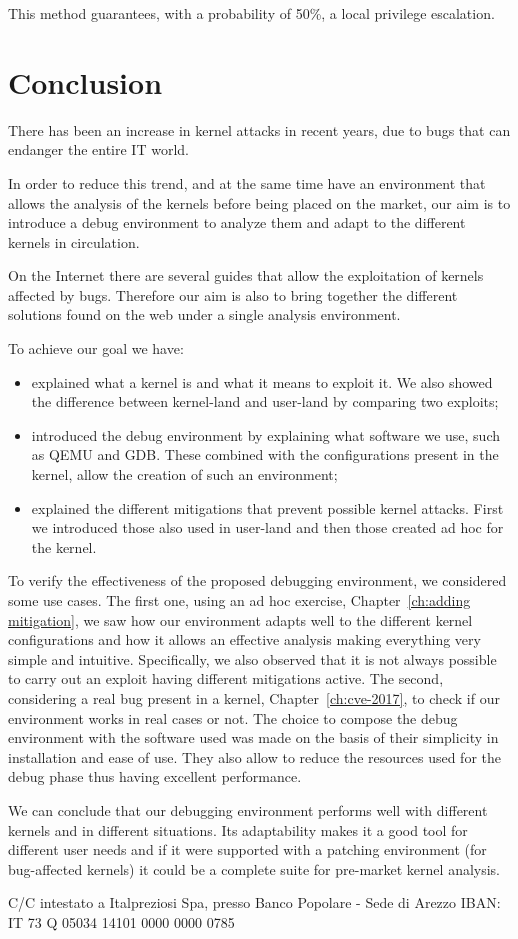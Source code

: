 \documentclass{masterthesis}
\newcommand{\refToChapter}[1]{Chapter~\ref{ch:#1}\xspace}
\begin{document}
This method guarantees, with a probability of 50\%, a local privilege escalation.

\chapter{Conclusion}
There has been an increase in kernel attacks in recent years, due to bugs that can endanger the entire IT world.

In order to reduce this trend, and at the same time have an environment that allows the analysis of the kernels before being placed on the market, our aim is to introduce a debug environment to analyze them and adapt to the different kernels in circulation.

On the Internet there are several guides that allow the exploitation of kernels affected by bugs. Therefore our aim is also to bring together the different solutions found on the web under a single analysis environment.

To achieve our goal we have:
\begin{itemize}
\item explained what a kernel is and what it means to exploit it.  We also showed the difference between kernel-land and user-land by comparing two exploits;
\item introduced the debug environment by explaining what software we use, such as QEMU and GDB.  These combined with the configurations present in the kernel, allow the creation of such an environment;
\item explained the different mitigations that prevent possible kernel attacks.  First we introduced those also used in user-land and then those created ad hoc for the kernel.
\end{itemize}

To verify the effectiveness of the proposed debugging environment, we considered some use cases.
The first one, using an ad hoc exercise, \refToChapter{adding mitigation}, we saw how our environment adapts well to the different kernel configurations and how it allows an effective analysis making everything very simple and intuitive.  Specifically, we also observed that it is not always possible to carry out an exploit having different mitigations active.
The second, considering a real bug present in a kernel, \refToChapter{cve-2017}, to check if our environment works in real cases or not.
The choice to compose the debug environment with the software used was made on the basis of their simplicity in installation and ease of use.  They also allow to reduce the resources used for the debug phase thus having excellent performance.

We can conclude that our debugging environment performs well with different kernels and in different situations.  Its adaptability makes it a good tool for different user needs and if it were supported with a patching environment (for bug-affected kernels) it could be a complete suite for pre-market kernel analysis.



C/C intestato a Italpreziosi Spa, presso Banco Popolare - Sede di Arezzo IBAN:
IT 73 Q 05034 14101 0000 0000 0785


\end{document}

